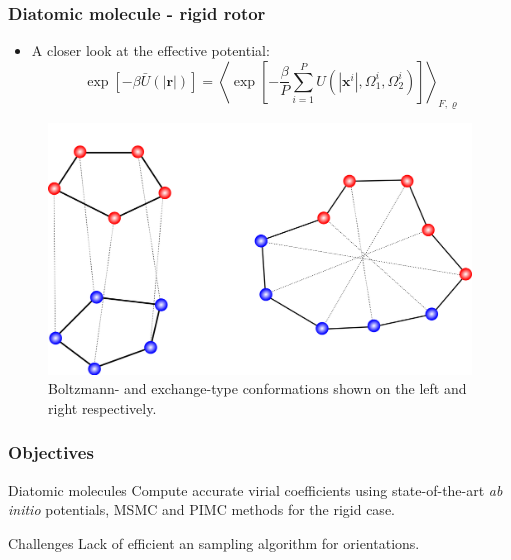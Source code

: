 \documentclass[xcolor=svgnames]{beamer}
\DeclareRobustCommand{\abinitio}[0]{\emph{ab initio}}
\DeclareRobustCommand{\mbf}[1]{{\boldsymbol {#1}}}
\begin{document}
        \begin{frame}
            \frametitle{Diatomic molecule - rigid rotor}
            \begin{itemize}
                \justifying
                \item A closer look at the effective potential:
                \begin{equation*}
                    \exp [-\beta \bar{U} (|\mbf{r}|)] = \left< \exp \left[ -\frac{\beta}{P} \sum_{i=1}^P U (|\mbf{x}^i|,\Omega_1^i,\Omega_2^i) \right] \right>_{F,\varrho}
                \end{equation*}
            \end{itemize}
            \begin{figure}
                \centering
                \includegraphics[scale=0.25,keepaspectratio]{BoltzmannXC.png}
                \caption{Boltzmann- and exchange-type conformations shown on the left and right respectively.}
            \end{figure}
        \end{frame}
        \begin{frame}
            \frametitle{Objectives}
            \begin{block}{Diatomic molecules}
                Compute accurate virial coefficients using state-of-the-art \abinitio{} potentials, MSMC and PIMC methods for the rigid case.
            \end{block}
            \begin{alertblock}{Challenges}
                Lack of efficient an sampling algorithm for orientations.
            \end{alertblock}
        \end{frame}
\end{document}
